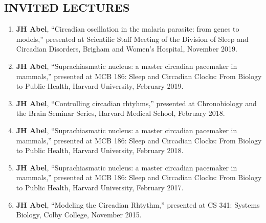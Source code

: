 \documentclass[line,10pt]{res}
\begin{document}
\begin{resume}
\section{\bf INVITED LECTURES}
\vspace{1em}\null
\begin{enumerate}
    \setlength\itemsep{0.8em}
    \item \textbf{JH Abel}, 
``Circadian oscillation in the malaria parasite: from genes to models,'' presented at Scientific Staff Meeting of the Division of Sleep and Circadian Disorders, Brigham and Women's Hospital, November 2019.
\item \textbf{JH Abel}, 
``Suprachiasmatic nucleus: a master circadian pacemaker in mammals,'' presented at MCB 186: Sleep and Circadian Clocks: From Biology to Public Health, Harvard University, February 2019.
\item \textbf{JH Abel}, 
``Controlling circadian rhtyhms,'' presented at Chronobiology and the Brain Seminar Series, Harvard Medical School, February 2018.
\item \textbf{JH Abel}, 
``Suprachiasmatic nucleus: a master circadian pacemaker in mammals,'' presented at MCB 186: Sleep and Circadian Clocks: From Biology to Public Health, Harvard University, February 2018.
\item \textbf{JH Abel}, 
``Suprachiasmatic nucleus: a master circadian pacemaker in mammals,'' presented at MCB 186: Sleep and Circadian Clocks: From Biology to Public Health, Harvard University, February 2017.
    \item \textbf{JH Abel}, 
``Modeling the Circadian Rhtythm,'' presented at CS 341: Systems Biology, Colby College, November 2015.
\end{enumerate}


\end{resume}
\end{document}
